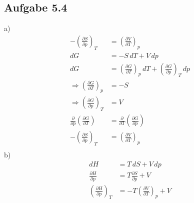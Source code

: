 \documentclass{article}
\begin{document}
\subsection*{Aufgabe 5.4}
a)
\begin{align*}
    -\left(\frac{\partial S}{\partial p}\right)_T &= \left(\frac{\partial V}{\partial T}\right)_p\\
    dG &= -S\,dT+V\,dp\\
    dG &= \left(\frac{\partial G}{\partial T}\right)_p \,dT + \left(\frac{\partial G}{\partial p}\right)_T\,dp\\
    \Rightarrow \left(\frac{\partial G}{\partial T}\right)_p &= -S\\
    \Rightarrow \left(\frac{\partial G}{\partial p}\right)_T &= V\\
    \frac{\partial}{\partial p}\left(\frac{\partial G}{\partial T}\right) &= \frac{\partial}{\partial T}\left(\frac{\partial G}{\partial p}\right)\\
    -\left(\frac{\partial S}{\partial p}\right)_T &= \left(\frac{\partial V}{\partial T}\right)_p\\
\end{align*}
b)
\begin{align*}
    dH &= T\,dS + V\,dp\\
    \frac{\partial H}{\partial p} &= T\frac{\partial S}{\partial p}+V\\
    \left(\frac{\partial H}{\partial p}\right)_T &= -T \left(\frac{\partial V}{\partial T}\right)_p + V
\end{align*}
\end{document}
